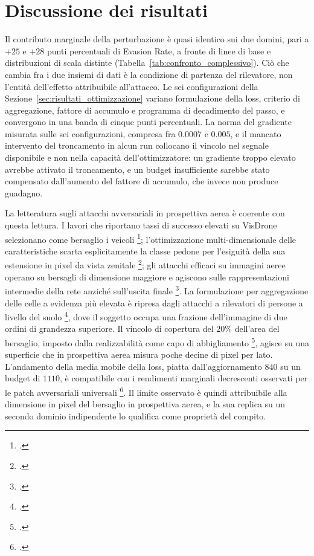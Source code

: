\documentclass[a4paper,12pt]{report}
\begin{document}
\section{Discussione dei risultati}
\label{sec:discussione}

Il contributo marginale della perturbazione è quasi identico sui due domini, pari a $+25$ e $+28$ punti percentuali di Evasion Rate, a fronte di linee di base e distribuzioni di scala distinte (Tabella~\ref{tab:confronto_complessivo}). Ciò che cambia fra i due insiemi di dati è la condizione di partenza del rilevatore, non l'entità dell'effetto attribuibile all'attacco. Le sei configurazioni della Sezione~\ref{sec:risultati_ottimizzazione} variano formulazione della loss, criterio di aggregazione, fattore di accumulo e programma di decadimento del passo, e convergono in una banda di cinque punti percentuali. La norma del gradiente misurata sulle sei configurazioni, compresa fra $0.0007$ e $0.005$, e il mancato intervento del troncamento in alcun run collocano il vincolo nel segnale disponibile e non nella capacità dell'ottimizzatore: un gradiente troppo elevato avrebbe attivato il troncamento, e un budget insufficiente sarebbe stato compensato dall'aumento del fattore di accumulo, che invece non produce guadagno.

La letteratura sugli attacchi avversariali in prospettiva aerea è coerente con questa lettura. I lavori che riportano tassi di successo elevati su VisDrone selezionano come bersaglio i veicoli \footcite{shrestha_2023}; l'ottimizzazione multi-dimensionale delle caratteristiche scarta esplicitamente la classe pedone per l'esiguità della sua estensione in pixel da vista zenitale \footcite{xi_2025_lfrap}; gli attacchi efficaci su immagini aeree operano su bersagli di dimensione maggiore e agiscono sulle rappresentazioni intermedie della rete anziché sull'uscita finale \footcite{tang_2023}. La formulazione per aggregazione delle celle a evidenza più elevata è ripresa dagli attacchi a rilevatori di persone a livello del suolo \footcite{thys_2019}, dove il soggetto occupa una frazione dell'immagine di due ordini di grandezza superiore. Il vincolo di copertura del $20\%$ dell'area del bersaglio, imposto dalla realizzabilità come capo di abbigliamento \footcite{huang_2020_upc}, agisce su una superficie che in prospettiva aerea misura poche decine di pixel per lato. L'andamento della media mobile della loss, piatta dall'aggiornamento $840$ su un budget di $1110$, è compatibile con i rendimenti marginali decrescenti osservati per le patch avversariali universali \footcite{brown_2017_patch}. Il limite osservato è quindi attribuibile alla dimensione in pixel del bersaglio in prospettiva aerea, e la sua replica su un secondo dominio indipendente lo qualifica come proprietà del compito.
\end{document}
